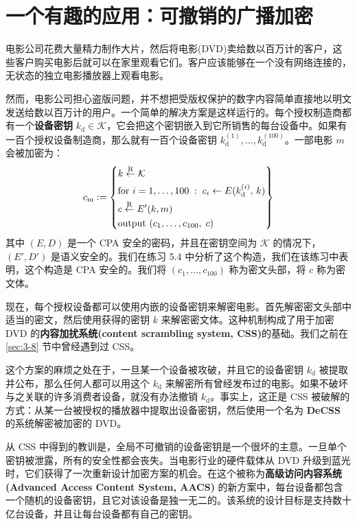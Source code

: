 \section{一个有趣的应用：可撤销的广播加密}

电影公司花费大量精力制作大片，然后将电影(DVD)卖给数以百万计的客户，这些客户购买电影后就可以在家里观看它们。客户应该能够在一个没有网络连接的，无状态的独立电影播放器上观看电影。

然而，电影公司担心盗版问题，并不想把受版权保护的数字内容简单直接地以明文发送给数以百万计的用户。一个简单的解决方案是这样运行的。每个授权制造商都有一个\textbf{设备密钥} $k_\mathrm{d}\in\mathcal{K}$，它会把这个密钥嵌入到它所销售的每台设备中。如果有一百个授权设备制造商，那么就有一百个设备密钥 $k^{(1)}_\mathrm{d}, \dots, k^{(100)}_\mathrm{d}$。一部电影 $m$ 会被加密为：
\[
c_\mathrm{m}:=
\left\{
\begin{aligned}
& k\overset{\rm R}\leftarrow\mathcal{K}\\
& \text{for } i=1,\dots,100\;:\; c_i\leftarrow E(k^{(i)}_\mathrm{d},\,k)\\
& c\overset{\rm R}\leftarrow E'(k,m)\\
& \text{output } (c_1,\dots,c_{100},\;c)
\end{aligned}
\right\}
\]
其中 $(E,D)$ 是一个 CPA 安全的密码，并且在密钥空间为 $\mathcal{K}$ 的情况下，$(E',D')$ 是语义安全的。我们在练习 5.4 中分析了这个构造，我们在该练习中表明，这个构造是 CPA 安全的。我们将 $(c_1, \dots, c_{100})$ 称为密文头部，将 $c$ 称为密文体。

现在，每个授权设备都可以使用内嵌的设备密钥来解密电影。首先解密密文头部中适当的密文，然后使用获得的密钥 $k$ 来解密密文体。这种机制构成了用于加密 DVD 的\textbf{内容加扰系统(content scrambling system, CSS)}的基础。我们之前在 \ref{sec:3-8} 节中曾经遇到过 CSS。

这个方案的麻烦之处在于，一旦某一个设备被攻破，并且它的设备密钥 $k_\mathrm{d}$ 被提取并公布，那么任何人都可以用这个 $k_\mathrm{d}$ 来解密所有曾经发布过的电影。如果不破坏与之关联的许多消费者设备，就没有办法撤销 $k_\mathrm{d}$。事实上，这正是 CSS 被破解的方式：从某一台被授权的播放器中提取出设备密钥，然后使用一个名为 \textbf{DeCSS} 的系统解密被加密的 DVD。

从 CSS 中得到的教训是，全局不可撤销的设备密钥是一个很坏的主意。一旦单个密钥被泄露，所有的安全性都会丧失。当电影行业的硬件载体从 DVD 升级到蓝光时，它们获得了一次重新设计加密方案的机会。在这个被称为\textbf{高级访问内容系统 (Advanced Access Content System, AACS)} 的新方案中，每台设备都包含一个随机的设备密钥，且它对该设备是独一无二的。该系统的设计目标是支持数十亿台设备，并且让每台设备都有自己的密钥。

